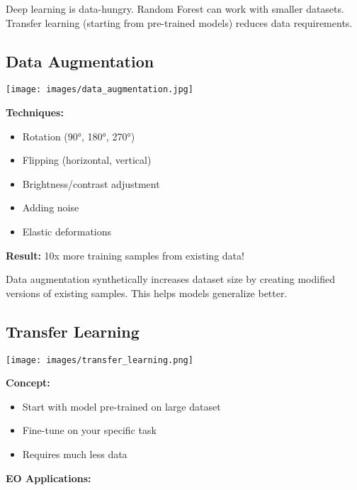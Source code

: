 \documentclass[
  letterpaper,
  DIV=11,
  numbers=noendperiod]{scrartcl}
\providecommand{\tightlist}{%
  \setlength{\itemsep}{0pt}\setlength{\parskip}{0pt}}
\begin{document}
Deep learning is data-hungry. Random Forest can work with smaller
datasets. Transfer learning (starting from pre-trained models) reduces
data requirements.

\subsection{Data Augmentation}\label{data-augmentation}

\begin{center}
\texttt{[image: images/data\_augmentation.jpg]}
\end{center}

\textbf{Techniques:}

\begin{itemize}
\tightlist
\item
  Rotation (90°, 180°, 270°)
\item
  Flipping (horizontal, vertical)
\item
  Brightness/contrast adjustment
\item
  Adding noise
\item
  Elastic deformations
\end{itemize}

\textbf{Result:} 10x more training samples from existing data!

Data augmentation synthetically increases dataset size by creating
modified versions of existing samples. This helps models generalize
better.

\subsection{Transfer Learning}\label{transfer-learning}

\begin{center}
\texttt{[image: images/transfer\_learning.png]}
\end{center}

\textbf{Concept:}

\begin{itemize}
\tightlist
\item
  Start with model pre-trained on large dataset
\item
  Fine-tune on your specific task
\item
  Requires much less data
\end{itemize}

\textbf{EO Applications:}
\end{document}
